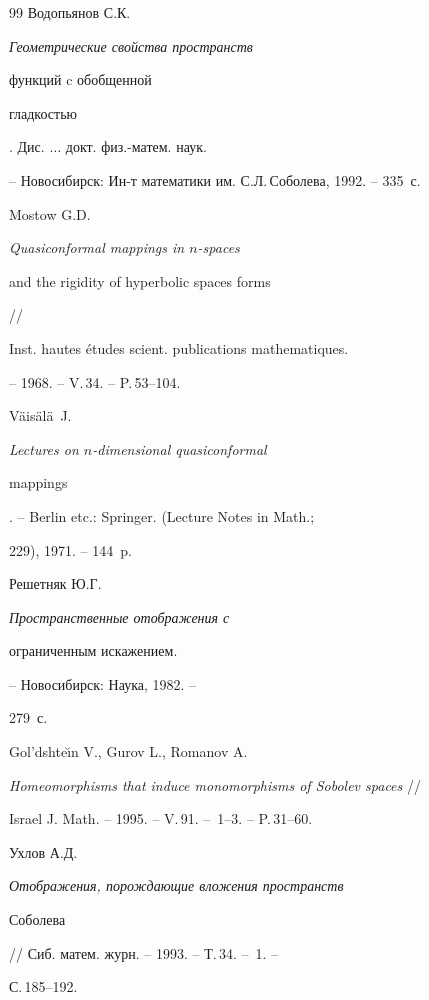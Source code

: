 \begin{thebibliography}{99}
Водопьянов С.К. {\it Геометрические свойства пространств


функций c обобщенной


гладкостью}. Дис. $\dotsc$ докт. физ.-матем. наук.


-- Новосибирск: Ин-т математики им. С.Л.\,Со\-болева, 1992. -- 335~с.







Mostow G.D. {\it Quasiconformal mappings in $n$-spaces 


and the rigidity of hyperbolic spaces forms} //


Inst. hautes \'etudes scient. publications mathematiques.


-- 1968. -- V.\,34. -- P.\,53--104.







V\"ais\"al\"a~J. {\it Lectures on $n$-dimensional quasiconformal


mappings}. -- Berlin etc.: Springer. (Lecture Notes in Math.;


229), 1971. -- 144~p.







Решетняк Ю.Г. {\it Пространственные отображения с


ограниченным искажением.} -- Новосибирск: Наука, 1982. --


279~с.







Gol'dshte\u\i{}n V., Gurov L., Romanov A.


{\it Homeomorphisms that induce monomorphisms of Sobolev spaces} //


Israel J. Math. -- 1995. -- V.\,91. -- \No\,1--3. -- P.\,31--60.







Ухлов А.Д. {\it Отображения, порождающие вложения пространств


Соболева} // Сиб. матем. журн. -- 1993. -- Т.\,34. -- \No\,1. --


С.\,185--192.








\end{thebibliography}
